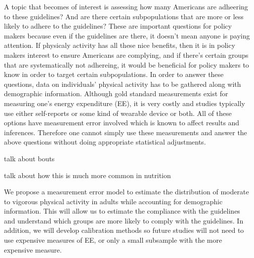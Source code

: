 \documentclass[11pt]{article}\usepackage[]{graphicx}\usepackage[]{color}
\begin{document}
A topic that becomes of interest is assessing how many Americans are adheering to these guidelines? And are there certain subpopulations that are more or less likely to adhere to the guidelines? These are important questions for policy makers because even if the guidelines are there, it doesn't mean anyone is paying attention. If physicaly activity has all these nice benefits, then it is in policy makers interest to ensure Americans are complying, and if there's certain groups that are systematically not adhereing, it would be beneficial for policy makers to know in order to target certain subpopulations.  In order to answer these questions, data on individuals' physical activity has to be gathered along with demographic information. Although gold standard measurements exist for measuring one's energy expenditure (EE), it is very costly and studies typically use either self-reports or some kind of wearable device or both. All of these options have measurement error involved which is known to affect results and inferences. Therefore one cannot simply use these measurements and answer the above questions without doing appropriate statistical adjustments. 


talk about bouts

talk about how this is much more common in nutrition

We propose a measurement error model to estimate the distribution of moderate to vigorous physical activity in adults while accounting for demographic information. This will allow us to estimate the compliance with the guidelines and understand which groups are more likely to comply with the guidelines. In addition, we will develop calibration methods so future studies will not need to use expensive measures of EE, or only a small subsample with the more expensive measure. 


\clearpage
\end{document}
